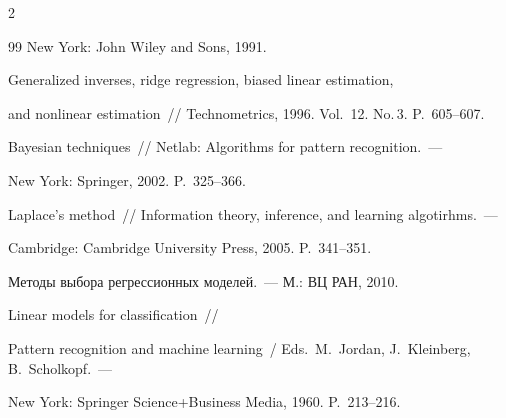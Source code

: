 \begin{multicols}{2}
{{\begin{thebibliography}{99}
New York: John Wiley and Sons, 1991.




 Generalized inverses, ridge regression, biased linear estimation, 

and nonlinear estimation~// Technometrics, 1996. Vol.~12. No.\,3. P.~605--607.




 Bayesian techniques~// Netlab: Algorithms for pattern recognition.~--- 

New York: Springer, 2002. P.~325--366.




 Laplace's method~// Information theory, inference, and learning algotirhms.~--- 

Cambridge: Cambridge University Press, 2005. P.~341--351.






 Методы выбора регрессионных моделей.~--- М.: ВЦ РАН, 2010.





\label{end\stat}




 Linear models for classification~// 

Pattern recognition and machine learning~/ Eds.\ M.~Jordan, J.~Kleinberg, B.~Scholkopf.~--- 

New York: Springer Science\;+\;Business Media, 1960. P.~213--216.

\end{thebibliography}

}

}





\end{multicols}

